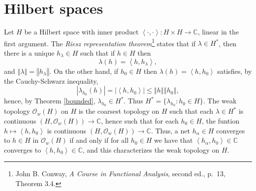 \documentclass{article}
\newcommand{\inner}[2]{\left\langle #1, #2 \right\rangle}
\newcommand{\norm}[1]{\left\Vert #1 \right\Vert}
\begin{document}
\section{Hilbert spaces}
Let $H$ be a Hilbert space with inner product $\inner{\cdot}{\cdot}:H \times H \to \mathbb{C}$, linear in the first argument.  
The {\em Riesz representation theorem}\footnote{John B. Conway, {\em A Course in Functional Analysis}, second ed.,
p.~13, Theorem 3.4.} states that if $\lambda \in H^*$, then there is a unique $h_\lambda \in H$ such that
if $h \in H$ then 
\[
\lambda(h)=\inner{h}{h_\lambda},
\]
and $\norm{\lambda}=\norm{h_\lambda}$.
On the other hand, if $h_0 \in H$ then $\lambda(h)=\inner{h}{h_0}$ satisfies, by the Cauchy-Schwarz inequality,
\[
|\lambda_{h_0}(h)| = |\inner{h}{h_0}| \leq \norm{h} \norm{h_0}, 
\]
hence, by Theorem \ref{bounded}, $\lambda_{h_0} \in H^*$. Thus $H^*=\{\lambda_{h_0}: h_0 \in H\}$.
The weak topology $\mathcal{O}_w(H)$ on $H$ is the coarsest topology on $H$ such that
each $\lambda \in H^*$ is continuous $(H,\mathcal{O}_w(H)) \to \mathbb{C}$, hence such that
for each $h_0 \in H$,  the funtion $h \mapsto \inner{h}{h_0}$ is continuous $(H,\mathcal{O}_w(H)) \to \mathbb{C}$.
Thus, a net $h_\alpha \in H$ converges to $h \in H$ in $\mathcal{O}_w(H)$ if and only if for all $h_0 \in H$ we have that
 $\inner{h_\alpha}{h_0} \in \mathbb{C}$ converges to  $\inner{h}{h_0} \in \mathbb{C}$, and this characterizes the weak topology on $H$.
\end{document}
